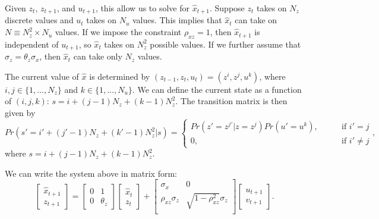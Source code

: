 Given $z_{t}$, $z_{t+1}$, and $u_{t+1}$, this allow us to solve for $\hat{x}_{t+1}$.
Suppose $z_t$ takes on $N_z$ discrete values and $u_t$ takes on $N_u$ values. 
This implies that $\hat{x}_t$ can take on $N \equiv N_z^2 \times N_u$ values. 
If we impose the constraint $\rho_{xz} = 1$, then $\hat{x}_{t+1}$ is independent of $u_{t+1}$, so $\hat{x}_t$ takes on $N_z^2$ possible values. If we further assume that $\sigma_z = \theta_z \sigma_x$, then $\hat{x}_t$ can take only $N_z$ values. 

The current value of $\hat{x}$ is determined by $(z_{t-1}, z_{t}, u_t) = (z^i, z^j, u^k)$, where $i, j \in \{1, \ldots, N_z\}$ and $k\in \{1, \ldots, N_u\}$. 
We can define the current state as a function of $(i,j,k)$: $s = i + (j-1) N_z + (k-1) N_z^2$. 
The transition matrix is then given by
\begin{equation}
    Pr(s' = i' + (j'-1) N_z + (k'-1) N_z^2 | s) =   \left\{ 
    \begin{matrix}
    Pr(z' = z^{j'}|z = z^j) Pr(u' = u^k), \qquad    &\text{if } i'= j\\
    0, \qquad    &\text{if } i' \neq j
    \end{matrix}
    \right.,
\end{equation}
where $s = i + (j-1) N_z + (k-1) N_z^2$.

We can write the system above in matrix form:
\begin{equation}
    \left[ 
    \begin{matrix}
        \hat{x}_{t+1} \\
        z_{t+1}
    \end{matrix}
    \right] = \left[ 
        \begin{matrix}
            0 & 1 \\
            0 & \theta_z
        \end{matrix}  
    \right]\left[
    \begin{matrix}
        \hat{x}_{t}\\
        z_t
    \end{matrix}
    \right] + \left[ 
    \begin{matrix}
        \sigma_x & 0\\
        \rho_{xz} \sigma_z & \sqrt{1 - \rho_{xz}^2}\sigma_{z}\\
    \end{matrix}
    \right] \left[
    \begin{matrix}
        u_{t+1}\\
        v_{t+1}
    \end{matrix}
    \right].
\end{equation}

